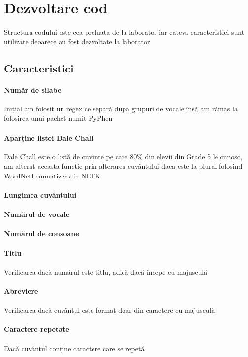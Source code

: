 \documentclass{article}
\begin{document}
 
\section{Dezvoltare cod}
\paragraph{} Structura codului este cea preluata de la laborator iar
cateva caracteristici sunt utilizate deoarece au fost
dezvoltate la laborator
 
\subsection{Caracteristici}
\paragraph{Număr de silabe} Inițial am folosit un regex ce separă dupa grupuri de vocale însă
am rămas la folosirea unui pachet numit PyPhen
\paragraph{Aparține listei Dale Chall} Dale Chall este o listă de cuvinte pe
care 80\% din elevii din Grade 5 le cunosc, am alterat aceasta functie
prin alterarea cuvântului daca este la plural folosind WordNetLemmatizer din NLTK.
\paragraph{Lungimea cuvântului}
\paragraph{Numărul de vocale}
\paragraph{Numărul de consoane}
\paragraph{Titlu} Verificarea dacă numărul este titlu, adică dacă începe cu majusculă
\paragraph{Abreviere} Verificarea dacă cuvântul este format doar din caractere cu majusculă
\paragraph{Caractere repetate} Dacă cuvântul conține caractere care se repetă
\end{document}

